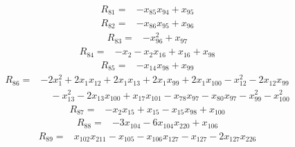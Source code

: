 \begin{equation*}\begin{split}
R_{81}={}&-x_{85} x_{94} + x_{95}
\end{split}\end{equation*}
\begin{equation*}\begin{split}
R_{82}={}&-x_{86} x_{95} + x_{96}
\end{split}\end{equation*}
\begin{equation*}\begin{split}
R_{83}={}&-x_{96}^{2} + x_{97}
\end{split}\end{equation*}
\begin{equation*}\begin{split}
R_{84}={}&-x_{2} - x_{2} x_{16} + x_{16} + x_{98}
\end{split}\end{equation*}
\begin{equation*}\begin{split}
R_{85}={}&-x_{14} x_{98} + x_{99}
\end{split}\end{equation*}
\begin{equation*}\begin{split}
R_{86}={}&-2x_{1}^{2} + 2x_{1} x_{12} + 2x_{1} x_{13} + 2x_{1} x_{99} + 2x_{1} x_{100} - x_{12}^{2} - 2x_{12} x_{99}\\
&\quad -x_{13}^{2} - 2x_{13} x_{100} + x_{17} x_{101} - x_{78} x_{97} - x_{80} x_{97} - x_{99}^{2} - x_{100}^{2}
\end{split}\end{equation*}
\begin{equation*}\begin{split}
R_{87}={}&-x_{2} x_{15} + x_{15} - x_{15} x_{98} + x_{100}
\end{split}\end{equation*}
\begin{equation*}\begin{split}
R_{88}={}&-3x_{104} - 6x_{104} x_{220} + x_{106}
\end{split}\end{equation*}
\begin{equation*}\begin{split}
R_{89}={}&x_{102} x_{211} - x_{105} - x_{106} x_{127} - x_{127} - 2x_{127} x_{226}
\end{split}\end{equation*}

